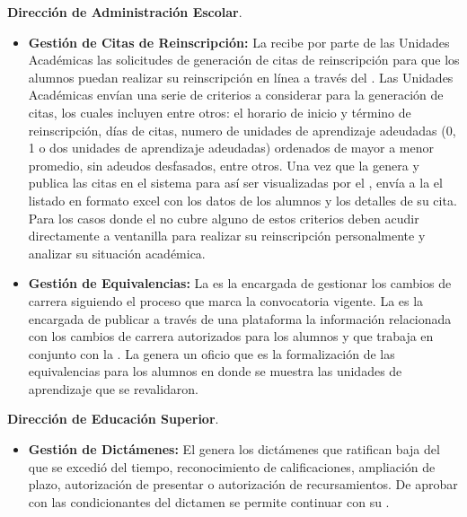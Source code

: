 \begin{ADescripcion}
\begin{itemize}
	\end{itemize}

	\item \textbf{Dirección de Administración Escolar}.
	
	\begin{itemize}
		
	\item \textbf{Gestión de Citas de Reinscripción:} La  recibe por parte de las Unidades Académicas las solicitudes de generación de citas de reinscripción para que los alumnos puedan realizar su reinscripción  en línea a través del . Las Unidades Académicas envían una serie de criterios a considerar para la generación de citas, los cuales incluyen entre otros: el horario de inicio y término de reinscripción, días de citas, numero de unidades de aprendizaje adeudadas (0, 1 o dos unidades de aprendizaje adeudadas) ordenados de mayor a menor promedio, sin adeudos desfasados, entre otros. Una vez que la  genera  y publica las citas en el sistema  para así ser visualizadas por el , envía a la  el listado en formato excel con los datos de los alumnos y los detalles de su cita. Para los casos donde el  no cubre alguno de estos criterios deben acudir directamente a ventanilla para realizar su reinscripción personalmente y  analizar su situación académica. \\
	 	
	
	\item \textbf{Gestión de Equivalencias:} La  es la encargada de gestionar los cambios de carrera siguiendo el proceso que marca la convocatoria vigente. La  es la encargada de publicar a través de una plataforma la información relacionada con los cambios de carrera autorizados para los alumnos y que trabaja en conjunto con la . La  genera  un oficio que es la formalización de las equivalencias para los alumnos en donde se muestra las unidades de aprendizaje que se revalidaron. 
	
	\end{itemize}
	
	\item \textbf{Dirección de Educación Superior}.
	
	\begin{itemize}
	\item \textbf{Gestión de Dictámenes:} El  genera los dictámenes que ratifican baja del  que se excedió del tiempo, reconocimiento de calificaciones, ampliación de plazo, autorización de presentar  o autorización de recursamientos. De aprobar con las condicionantes del dictamen se permite continuar con su . 
	

\end{itemize}
\end{ADescripcion}
